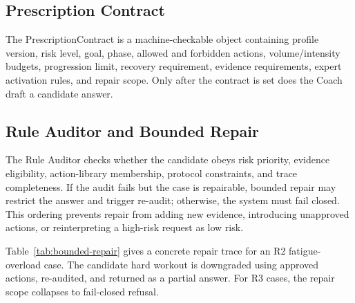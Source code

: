 \documentclass{ceurart}
\begin{document}
\subsection{Prescription Contract}

The PrescriptionContract is a machine-checkable object containing profile version, risk level, goal, phase, allowed and forbidden actions, volume/intensity budgets, progression limit, recovery requirement, evidence requirements, expert activation rules, and repair scope. Only after the contract is set does the Coach draft a candidate answer.

\subsection{Rule Auditor and Bounded Repair}

The Rule Auditor checks whether the candidate obeys risk priority, evidence eligibility, action-library membership, protocol constraints, and trace completeness. If the audit fails but the case is repairable, bounded repair may restrict the answer and trigger re-audit; otherwise, the system must fail closed. This ordering prevents repair from adding new evidence, introducing unapproved actions, or reinterpreting a high-risk request as low risk.

Table~\ref{tab:bounded-repair} gives a concrete repair trace for an R2 fatigue-overload case. The candidate hard workout is downgraded using approved actions, re-audited, and returned as a partial answer. For R3 cases, the repair scope collapses to fail-closed refusal.
\end{document}
